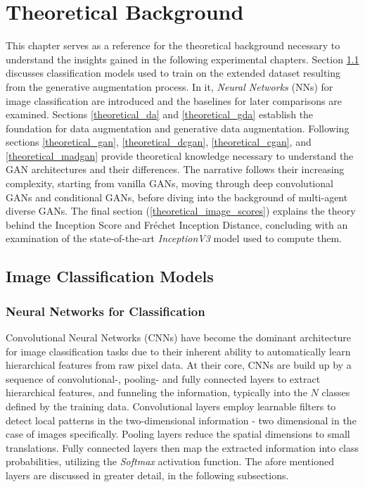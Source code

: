 \section{Theoretical Background}\label{body_theoretical_background}
This chapter serves as a reference for the theoretical background necessary to understand the insights gained in the following experimental chapters.
Section \ref{theoretical_classification} discusses classification models used to train on the extended dataset resulting from the generative augmentation process. In it, \textit{Neural Networks} (NNs) for image classification are introduced and the baselines for later comparisons are examined.
Sections \ref{theoretical_da} and \ref{theoretical_gda} establish the foundation for data augmentation and generative data augmentation.
Following sections \ref{theoretical_gan}, \ref{theoretical_dcgan}, \ref{theoretical_cgan}, and \ref{theoretical_madgan} provide theoretical knowledge necessary to understand the GAN architectures and their differences. The narrative follows their increasing complexity, starting from vanilla GANs, moving through deep convolutional GANs and conditional GANs, before diving into the background of multi-agent diverse GANs.
The final section (\ref{theoretical_image_scores}) explains the theory behind the Inception Score and Fréchet Inception Distance, concluding with an examination of the state-of-the-art \textit{InceptionV3} model used to compute them.
\subsection{Image Classification Models}\label{theoretical_classification}
\subsubsection{Neural Networks for Classification}
Convolutional Neural Networks (CNNs) have become the dominant architecture for image classification tasks due to their inherent ability to automatically learn hierarchical features from raw pixel data. At their core, CNNs are build up by a sequence of convolutional-, pooling- and fully connected layers to extract hierarchical features, and funneling the information, typically into the \(N\) classes defined by the training data. Convolutional layers employ learnable filters to detect local patterns in the two-dimensional information - two dimensional in the case of images specifically. Pooling layers reduce the spatial dimensions to small translations. Fully connected layers then map the extracted information into class probabilities, utilizing the \textit{Softmax} activation function. The afore mentioned layers are discussed in greater detail, in the following subsections.

